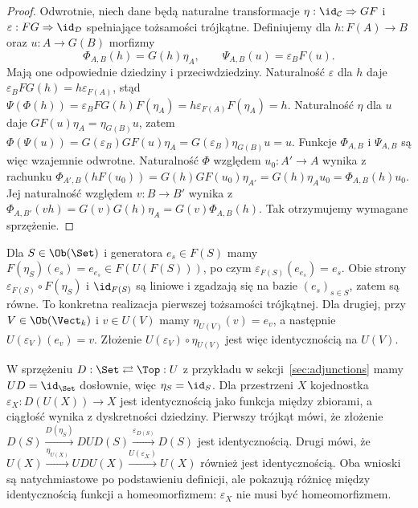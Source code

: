\begin{proof}
Odwrotnie, niech dane będą naturalne transformacje $\eta:\id_{\mathcal C}\Rightarrow GF$ i $\varepsilon:FG\Rightarrow\id_{\mathcal D}$ spełniające tożsamości trójkątne. Definiujemy dla $h:F(A)\to B$ oraz $u:A\to G(B)$ morfizmy
\[
\Phi_{A,B}(h)=G(h)\eta_A,\qquad
\Psi_{A,B}(u)=\varepsilon_BF(u).
\]
Mają one odpowiednie dziedziny i przeciwdziedziny. Naturalność $\varepsilon$ dla $h$ daje $\varepsilon_BFG(h)=h\varepsilon_{F(A)}$, stąd
$\Psi(\Phi(h))=\varepsilon_BFG(h)F(\eta_A)=h\varepsilon_{F(A)}F(\eta_A)=h$.
Naturalność $\eta$ dla $u$ daje $GF(u)\eta_A=\eta_{G(B)}u$, zatem
$\Phi(\Psi(u))=G(\varepsilon_B)GF(u)\eta_A=G(\varepsilon_B)\eta_{G(B)}u=u$.
Funkcje $\Phi_{A,B}$ i $\Psi_{A,B}$ są więc wzajemnie odwrotne. Naturalność $\Phi$ względem $u_0:A'\to A$ wynika z rachunku
$\Phi_{A',B}(hF(u_0))=G(h)GF(u_0)\eta_{A'}=G(h)\eta_Au_0=\Phi_{A,B}(h)u_0$.
Jej naturalność względem $v:B\to B'$ wynika z $\Phi_{A,B'}(vh)=G(v)G(h)\eta_A=G(v)\Phi_{A,B}(h)$. Tak otrzymujemy wymagane sprzężenie.
\end{proof}

\begin{przyklad}
Dla $S\in\Ob(\Set)$ i generatora $e_s\in F(S)$ mamy $F(\eta_S)(e_s)=e_{e_s}\in F(U(F(S)))$, po czym $\varepsilon_{F(S)}(e_{e_s})=e_s$. Obie strony $\varepsilon_{F(S)}\circ F(\eta_S)$ i $\id_{F(S)}$ są liniowe i zgadzają się na bazie $(e_s)_{s\in S}$, zatem są równe. To konkretna realizacja pierwszej tożsamości trójkątnej. Dla drugiej, przy $V\in\Ob(\Vect_k)$ i $v\in U(V)$ mamy $\eta_{U(V)}(v)=e_v$, a następnie $U(\varepsilon_V)(e_v)=v$. Złożenie $U(\varepsilon_V)\circ\eta_{U(V)}$ jest więc identycznością na $U(V)$.
\end{przyklad}


\begin{przyklad}
W sprzężeniu $D:\Set\rightleftarrows\Top:U$ z przykładu w sekcji~\ref{sec:adjunctions} mamy $UD=\id_{\Set}$ dosłownie, więc $\eta_S=\id_S$. Dla przestrzeni $X$ kojednostka $\varepsilon_X:D(U(X))\to X$ jest identycznością jako funkcja między zbiorami, a ciągłość wynika z dyskretności dziedziny. Pierwszy trójkąt mówi, że złożenie $D(S)\xrightarrow{D(\eta_S)}DUD(S)\xrightarrow{\varepsilon_{D(S)}}D(S)$ jest identycznością. Drugi mówi, że $U(X)\xrightarrow{\eta_{U(X)}}UDU(X)\xrightarrow{U(\varepsilon_X)}U(X)$ również jest identycznością. Oba wnioski są natychmiastowe po podstawieniu definicji, ale pokazują różnicę między identycznością funkcji a homeomorfizmem: $\varepsilon_X$ nie musi być homeomorfizmem.
\end{przyklad}


